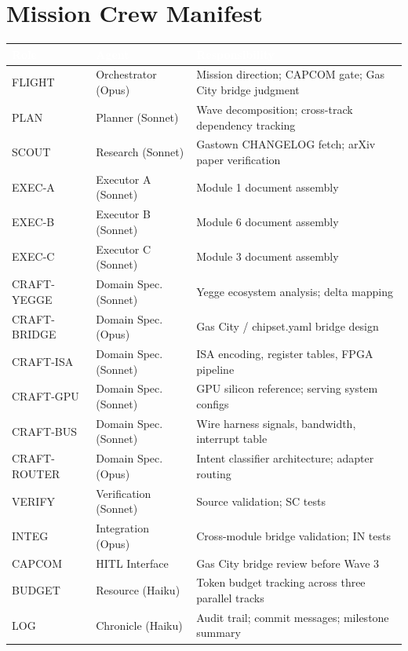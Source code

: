 \documentclass[11pt,letterpaper]{article}
\newcommand{\tableheader}[1]{\textbf{\sffamily\textcolor{white}{#1}}}
\begin{document}
\section{Mission Crew Manifest}

\begin{center}
\begin{tabularx}{\textwidth}{L{2.5cm}L{3cm}X}
\toprule
{}
\tableheader{Role} & \tableheader{Agent} & \tableheader{Responsibility} \\
\midrule
FLIGHT & Orchestrator (Opus) & Mission direction; CAPCOM gate; Gas City bridge judgment \\
PLAN & Planner (Sonnet) & Wave decomposition; cross-track dependency tracking \\
SCOUT & Research (Sonnet) & Gastown CHANGELOG fetch; arXiv paper verification \\
EXEC-A & Executor A (Sonnet) & Module 1 document assembly \\
EXEC-B & Executor B (Sonnet) & Module 6 document assembly \\
EXEC-C & Executor C (Sonnet) & Module 3 document assembly \\
CRAFT-YEGGE & Domain Spec. (Sonnet) & Yegge ecosystem analysis; delta mapping \\
CRAFT-BRIDGE & Domain Spec. (Opus) & Gas City / chipset.yaml bridge design \\
CRAFT-ISA & Domain Spec. (Sonnet) & ISA encoding, register tables, FPGA pipeline \\
CRAFT-GPU & Domain Spec. (Sonnet) & GPU silicon reference; serving system configs \\
CRAFT-BUS & Domain Spec. (Sonnet) & Wire harness signals, bandwidth, interrupt table \\
CRAFT-ROUTER & Domain Spec. (Opus) & Intent classifier architecture; adapter routing \\
VERIFY & Verification (Sonnet) & Source validation; SC tests \\
INTEG & Integration (Opus) & Cross-module bridge validation; IN tests \\
CAPCOM & HITL Interface & Gas City bridge review before Wave 3 \\
BUDGET & Resource (Haiku) & Token budget tracking across three parallel tracks \\
LOG & Chronicle (Haiku) & Audit trail; commit messages; milestone summary \\
\bottomrule
\end{tabularx}
\end{center}
\end{document}
